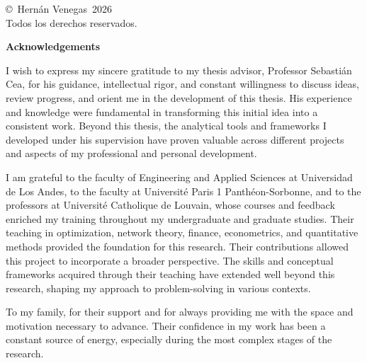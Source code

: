 
  \onehalfspacing


  \cleardoublepage
  \thispagestyle{empty}
  \begin{center}
    \copyright\ Hernán Venegas\ 2026 \\
    Todos los derechos reservados.
  \end{center}



  \cleardoublepage {}
  \begin{center} \Large \textbf{Acknowledgements} \end{center}
I wish to express my sincere gratitude to my thesis advisor, Professor Sebastián Cea, for his guidance, intellectual rigor, and constant willingness to discuss ideas, review progress, and orient me in the development of this thesis. His experience and knowledge were fundamental in transforming this initial idea into a consistent work. Beyond this thesis, the analytical tools and frameworks I developed under his supervision have proven valuable across different projects and aspects of my professional and personal development.

I am grateful to the faculty of Engineering and Applied Sciences at Universidad de Los Andes, to the faculty at Université Paris 1 Panthéon-Sorbonne, and to the professors at Université Catholique de Louvain, whose courses and feedback enriched my training throughout my undergraduate and graduate studies. Their teaching in optimization, network theory, finance, econometrics, and quantitative methods provided the foundation for this research. Their contributions allowed this project to incorporate a broader perspective. The skills and conceptual frameworks acquired through their teaching have extended well beyond this research, shaping my approach to problem-solving in various contexts.


To my family, for their support and for always providing me with the space and motivation necessary to advance. Their confidence in my work has been a constant source of energy, especially during the most complex stages of the research.

